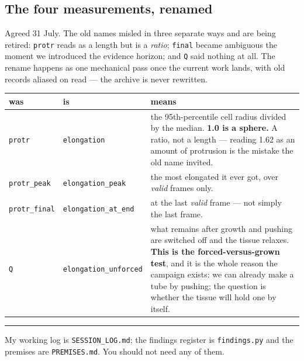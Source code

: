 \documentclass[11pt,a4paper]{article}
\newcommand{\code}[1]{\texttt{#1}}
\begin{document}
\subsection*{The four measurements, renamed}

Agreed 31 July. The old names misled in three separate ways and are being retired: \code{protr}
reads as a length but is a \emph{ratio}; \code{final} became ambiguous the moment we introduced
the evidence horizon; and \code{Q} said nothing at all. The rename happens as one mechanical pass
once the current work lands, with old records aliased on read --- the archive is never rewritten.

\begin{center}\small
\begin{tabular}{@{}l l p{7.9cm}@{}}
\toprule
\textbf{was} & \textbf{is} & \textbf{means}\\
\midrule
\code{protr} & \code{elongation}
& the 95th-percentile cell radius divided by the median. \textbf{1.0 is a sphere.} A ratio, not a
length --- reading 1.62 as an amount of protrusion is the mistake the old name invited.\\
\code{protr\_peak} & \code{elongation\_peak}
& the most elongated it ever got, over \emph{valid} frames only.\\
\code{protr\_final} & \code{elongation\_at\_end}
& at the last \emph{valid} frame --- not simply the last frame.\\
\code{Q} & \code{elongation\_unforced}
& what remains after growth and pushing are switched off and the tissue relaxes.
\textbf{This is the forced-versus-grown test}, and it is the whole reason the campaign exists: we
can already make a tube by pushing; the question is whether the tissue will hold one by itself.\\
\bottomrule
\end{tabular}
\end{center}

\vspace{6pt}
\hrule
\vspace{6pt}
{\small\color{grey}
My working log is \texttt{SESSION\_LOG.md}; the findings register is \texttt{findings.py} and the
premises are \texttt{PREMISES.md}. You should not need any of them.}
\end{document}
